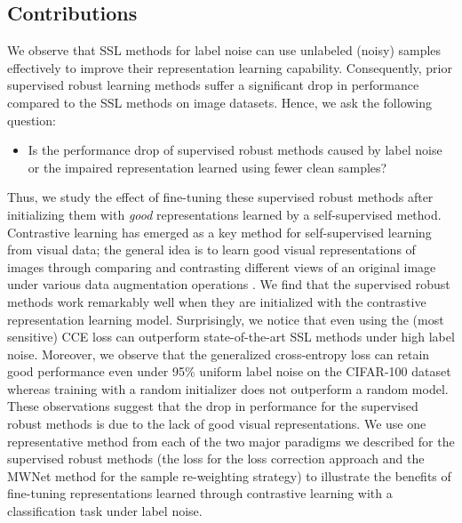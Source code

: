 \documentclass[final]{cvpr}
\begin{document}
\subsection{Contributions}
\vspace{-0.1cm}
We observe that SSL methods for label noise can use unlabeled (noisy) samples effectively to improve 
their representation learning capability. 
Consequently, prior supervised robust learning methods suffer a significant drop in performance compared to the SSL methods on image datasets.
Hence, we ask the following question:
\vspace{-0.2cm}
\begin{itemize}
[leftmargin=*]
\item Is the performance drop of supervised robust methods caused by label noise or the impaired representation learned using fewer clean samples?
\vspace{-0.2cm}
\end{itemize}
Thus, we study the effect of fine-tuning these supervised robust methods after initializing them with \emph{good} representations learned by a self-supervised method. Contrastive learning has emerged as a key method for self-supervised learning 
from visual data; the general idea is to learn good visual representations of images through comparing and contrasting different views of an original image under various data augmentation operations \cite{simclr,simclrv2}. We find that the supervised robust methods work remarkably well when they are initialized with the contrastive representation learning model. Surprisingly, we notice that even using the (most sensitive) CCE loss can outperform state-of-the-art SSL methods under high label noise. Moreover, we observe that the generalized cross-entropy loss \cite{generalized-ce} can retain good performance even under 95\% uniform label noise on the CIFAR-100 dataset whereas training with a random initializer does not outperform a random model. These observations suggest that the drop in performance for the supervised robust methods is due to the lack of good visual representations. We use one representative method from each of the two major paradigms we described for the supervised robust methods (the  loss for the loss correction approach and the MWNet method for the sample re-weighting strategy) 
to illustrate the benefits of fine-tuning representations learned through contrastive learning with a classification task under label noise.
\vspace{-0.1cm}
\end{document}
